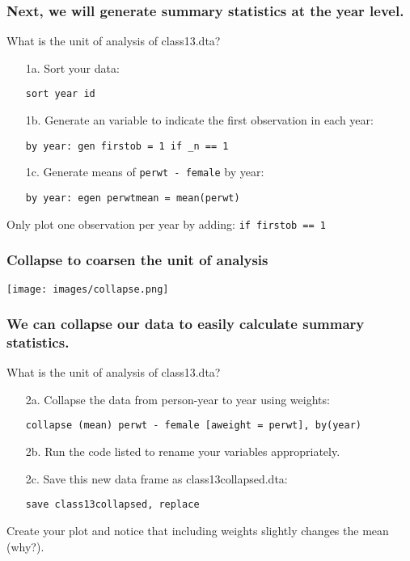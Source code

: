 \documentclass[11pt]{beamer}
\begin{document}
\begin{frame}
\frametitle{Next, we will generate summary statistics at the year level.}
What is the unit of analysis of class13.dta? \\ \bigskip \pause
\begin{itemize}
	\item[1a.] Sort your data: \pause
	\item[   ] \texttt{sort year id} \pause \bigskip
	\item[1b.] Generate an variable to indicate the first observation in each year: \pause
	\item[   ] \texttt{by year: gen firstob = 1 if \_n == 1} \pause \bigskip 
	\item[1c.] Generate means of \texttt{perwt - female} by year: \pause
	\item[   ] \texttt{by year: egen perwtmean = mean(perwt)}
\end{itemize} \pause \bigskip
Only plot one observation per year by adding: \pause \texttt{if firstob == 1}
\end{frame}

\begin{frame}
\frametitle{Collapse to coarsen the unit of analysis}
\begin{center}
	\texttt{[image: images/collapse.png]}
\end{center}
\end{frame}

\begin{frame}
\frametitle{We can collapse our data to easily calculate summary statistics.}
What is the unit of analysis of class13.dta? \\ \bigskip \pause
\begin{itemize}
	\item[2a.] Collapse the data from person-year to year using weights: 
	\item[   ] \texttt{collapse (mean) perwt - female [aweight = perwt], by(year)} \pause \bigskip
	\item[2b.] Run the code listed to rename your variables appropriately. \pause \bigskip
	\item[2c.] Save this new data frame as class13collapsed.dta: \pause
	\item[   ] \texttt{save class13collapsed, replace} \pause \bigskip 
\end{itemize}
Create your plot and notice that including weights slightly changes the mean (why?). 
\end{frame}
\end{document}
